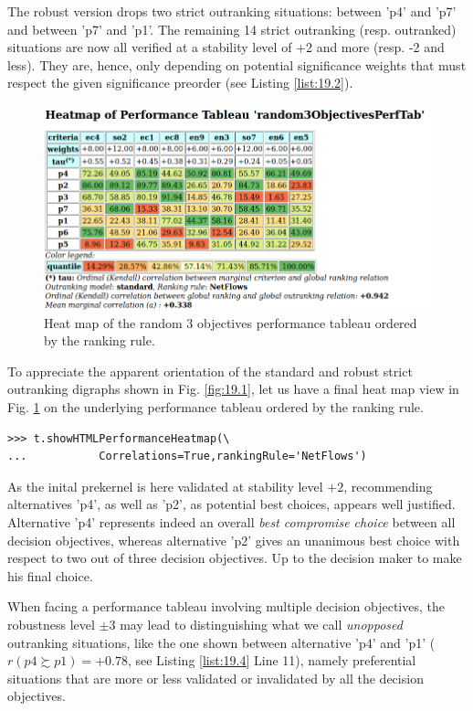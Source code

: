 The robust version drops two strict outranking situations: between 'p4' and 'p7' and between 'p7' and 'p1'. The remaining 14 strict outranking (resp. outranked) situations are now all verified at a stability level of +2 and more (resp. -2 and less). They are, hence, only depending on potential significance weights that must respect the given significance preorder (see Listing \ref{list:19.2}).

\begin{figure}[h]
\includegraphics[width=12cm]{Figures/robustHeatmap.png}
\caption{Heat map of the random 3 objectives performance tableau ordered by the \NetFlows ranking rule. } 
\label{fig:19.2}       %
\end{figure}

To appreciate the apparent orientation of the standard and robust strict outranking digraphs shown in Fig. \ref{fig:19.1}, let us have a final heat map view in Fig. \ref{fig:19.2} on the underlying performance tableau ordered by the \NetFlows ranking rule.
\begin{lstlisting}
>>> t.showHTMLPerformanceHeatmap(\
...           Correlations=True,rankingRule='NetFlows')
\end{lstlisting}
As the inital prekernel is here validated at stability level $+2$, recommending alternatives 'p4', as well as 'p2', as potential best choices, appears well justified. Alternative 'p4' represents indeed an overall \emph{best compromise choice} between all decision objectives, whereas alternative 'p2' gives an unanimous best choice with respect to two out of three decision objectives. Up to the decision maker to make his final choice.

When facing a performance tableau involving multiple decision objectives, the robustness level $\pm 3$  may lead to distinguishing what we call \emph{unopposed} outranking situations, like the one shown between alternative 'p4' and 'p1' ($r(p4 \succsim p1) = +0.78$, see Listing \ref{list:19.4} Line 11), namely preferential situations that are more or less validated or invalidated by all the decision objectives.  

